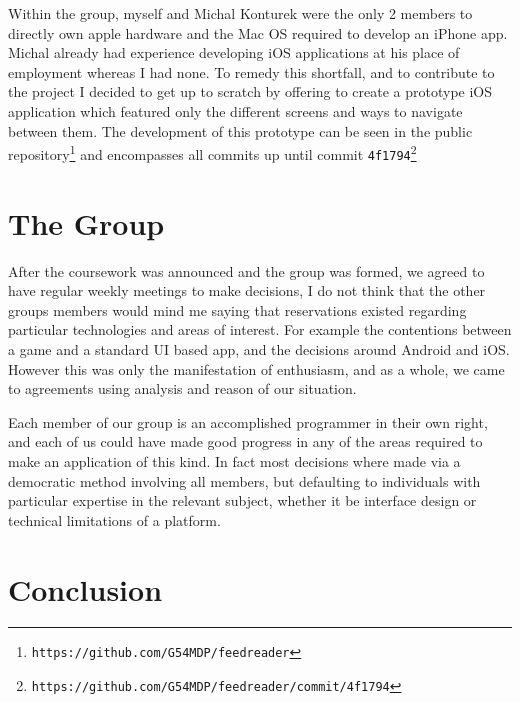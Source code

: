\documentclass[a4paper,11pt]{article}
\begin{document}
	Within the group, myself and Michal Konturek were the only 2 members to directly own apple hardware and the Mac OS required to develop an iPhone app. Michal already had experience developing iOS applications at his place of employment whereas I had none. To remedy this shortfall, and to contribute to the project I decided to get up to scratch by offering to create a prototype iOS application which featured only the different screens and ways to navigate between them. The development of this prototype can be seen in the public repository\footnote{\texttt{https://github.com/G54MDP/feedreader}} and encompasses all commits up until commit \verb!4f1794!\footnote{\texttt{https://github.com/G54MDP/feedreader/commit/4f1794}}
    
    \section{The Group}
    
    After the coursework was announced and the group was formed, we agreed to have regular weekly meetings to make decisions, I do not think that the other groups members would mind me saying that reservations existed regarding particular technologies and areas of interest. For example the contentions between a game and a standard UI based app, and the decisions around Android and iOS. However this was only the manifestation of enthusiasm, and as a whole, we came to agreements using analysis and reason of our situation.
    
    Each member of our group is an accomplished programmer in their own right, and each of us could have made good progress in any of the areas required to make an application of this kind. In fact most decisions where made via a democratic method involving all members, but defaulting to individuals with particular expertise in the relevant subject, whether it be interface design or technical limitations of a platform.
    
    \section{Conclusion}
\end{document}
